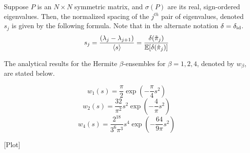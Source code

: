 \begin{definition}
Suppose $P$ is an $N \times N$ symmetric matrix, and $\sigma(P)$ are its real, sign-ordered eigenvalues. Then, the normalized spacing of the $j^{th}$ pair of eigenvalues, denoted $s_j$ is given by the following formula. Note that in the alternate notation $\delta = \delta_{\text{id}}$.
$$s_j = \frac{(\lambda_j - \lambda_{j+1})}{\langle s \rangle} = \frac{\delta({\tilde{\pi}}_{j})}{\mathbb{E}[\delta({\tilde{\pi}}_{j})]}$$
\end{definition}

The analytical results for the Hermite $\beta$-ensembles for $\beta = 1, 2, 4$, denoted by $w_\beta$, are stated below.

$$w_1(s) = \frac{\pi}{2} \exp(-\frac{\pi}{4}s^2)$$
$$w_2(s) = \frac{32}{\pi^2} s^2 \exp(-\frac{4}{\pi}s^2)$$
$$w_4(s) = \frac{2^{18}}{3^{6}\pi^3} s^4 \exp(-\frac{64}{9\pi}s^2)$$

[Plot]


